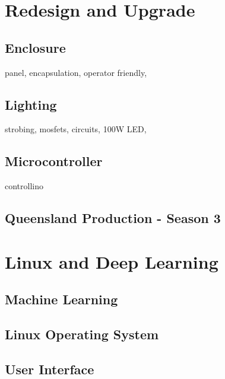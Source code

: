 \documentclass[fleqn,twoside]{article}
\begin{document}
\section{Redesign and Upgrade}
\label{sec:III}


\subsection{Enclosure}

panel, encapsulation, operator friendly, 


\subsection{Lighting}

strobing, mosfets, circuits, 100W LED, 


\subsection{Microcontroller}

controllino


\subsection{Queensland Production - Season 3}








\newpage

\section{Linux and Deep Learning}
\label{sec:IV}



\subsection{Machine Learning}



\subsection{Linux Operating System}



\subsection{User Interface}
\end{document}
